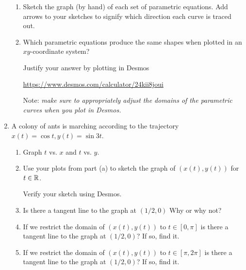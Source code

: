 \begin{enumerate}
    \begin{enumerate}
        \item Sketch the graph (by hand) of each set of parametric equations.
        Add arrows to your sketches to signify which direction each curve is traced out.

        \item Which parametric equations produce the same shapes when plotted in an $xy$-coordinate system? 
        
        Justify your answer by plotting in Desmos
        
        \url{https://www.desmos.com/calculator/24kii8joui}

        Note: \emph{make sure to appropriately adjust the domains of the parametric curves when you plot in Desmos.}
        
    \end{enumerate}


    \item A colony of ants is marching according to the trajectory $x(t) = \cos{t}, y(t)=\sin{3t}$. 
    \begin{enumerate}
    \item Graph $t$ vs.{} $x$ and $t$ vs.{} $y$.
    \item  Use your plots from part (a) to sketch the
    graph of $(x(t),y(t))$ for $t\in \mathbb{R}$.

    Verify your sketch using Desmos.

    \item Is there a tangent line to the graph at $(1/2,0)$ Why or why not?

    \item If we restrict the domain of $(x(t),y(t))$ to $t\in[0,\pi]$ is
    there a tangent line to the graph at $(1/2,0)$? If so, find it.
    
    \item If we restrict the domain of $(x(t),y(t))$ to $t\in[\pi,2\pi]$ is
    there a tangent line to the graph at $(1/2,0)$? If so, find it.

    \end{enumerate}
    
\end{enumerate}